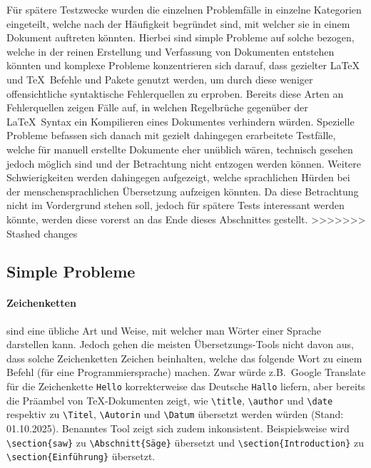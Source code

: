 Für spätere Testzwecke wurden die einzelnen Problemfälle in einzelne Kategorien eingeteilt, welche nach der Häufigkeit begründet sind, mit welcher sie in einem Dokument auftreten könnten. Hierbei sind simple Probleme auf solche bezogen, welche in der reinen Erstellung und Verfassung von Dokumenten entstehen könnten und komplexe Probleme konzentrieren sich darauf, dass gezielter \LaTeX{} und \TeX{}~Befehle und Pakete genutzt werden, um durch diese weniger offensichtliche syntaktische Fehlerquellen zu erproben. Bereits diese Arten an Fehlerquellen zeigen Fälle auf, in welchen Regelbrüche gegenüber der \LaTeX{}~Syntax ein Kompilieren eines Dokumentes verhindern würden. Spezielle Probleme befassen sich danach mit gezielt dahingegen erarbeitete Testfälle, welche für manuell erstellte Dokumente eher unüblich wären, technisch gesehen jedoch möglich sind und der Betrachtung nicht entzogen werden können. Weitere Schwierigkeiten werden dahingegen aufgezeigt, welche sprachlichen Hürden bei der menschensprachlichen Übersetzung aufzeigen könnten. Da diese Betrachtung nicht im Vordergrund stehen soll, jedoch für spätere Tests interessant werden könnte, werden diese vorerst an das Ende dieses Abschnittes gestellt. 
>>>>>>> Stashed changes

\subsection{Simple Probleme}
\paragraph*{Zeichenketten\label{par:zeichenketten}} sind eine übliche Art und Weise, mit welcher man Wörter einer Sprache darstellen kann. Jedoch gehen die meisten Übersetzungs-Tools nicht davon aus, dass solche Zeichenketten Zeichen beinhalten, welche das folgende Wort zu einem Befehl (für eine Programmiersprache) machen. Zwar würde z.B.\ Google Translate für die Zeichenkette \texttt{Hello} korrekterweise das Deutsche \texttt{Hallo} liefern, aber bereits die Präambel von \TeX{}-Dokumenten zeigt, wie \verb|\title|, \verb|\author| und \verb|\date| respektiv zu \verb|\Titel|, \verb|\Autorin| und \verb|\Datum| übersetzt werden würden (Stand: 01.10.2025). Benanntes Tool zeigt sich zudem inkonsistent. Beispielsweise wird \verb|\section{saw}| zu \verb|\Abschnitt{Säge}| übersetzt und \verb|\section{Introduction}| zu \verb|\section{Einführung}| übersetzt. 

